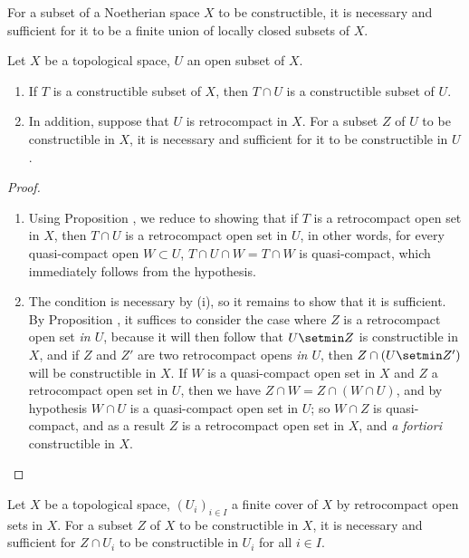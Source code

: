 \begin{corollary}[9.1.7]
\label{0.9.1.7}
For a subset of a Noetherian space $X$ to be constructible, it is necessary and sufficient for it to be a finite union of locally closed subsets of $X$.
\end{corollary}

\begin{proposition}[9.1.8]
\label{0.9.1.8}
Let $X$ be a topological space, $U$ an open subset of $X$.
\begin{enumerate}
  \item[{\rm(i)}] If $T$ is a constructible subset of $X$, then $T\cap U$ is a constructible subset of $U$.
  \item[{\rm(ii)}] In addition, suppose that $U$ is retrocompact in $X$. For a subset $Z$ of $U$ to be constructible in $X$, it is necessary and sufficient for it to be constructible in $U$.
\end{enumerate}
\end{proposition}

\begin{proof}
\medskip\noindent
\begin{enumerate}
  \item[(i)] Using Proposition , we reduce to showing that if $T$ is a retrocompact open set in $X$, then $T\cap U$ is a retrocompact open set in $U$, in other words, for every quasi-compact open $W\subset U$, $T\cap U\cap W=T\cap W$ is quasi-compact, which immediately follows from the hypothesis.
  \item[(ii)] The condition is necessary by (i), so it remains to show that it is sufficient.
    By Proposition , it suffices to consider the case where $Z$ is a retrocompact open set \emph{in $U$}, because it will then follow that $U\setmin Z$ is constructible in $X$, and if $Z$ and $Z'$ are two retrocompact opens \emph{in $U$}, then $Z\cap(U\setmin Z')$ will be constructible in $X$.
    If $W$ is a quasi-compact open set in $X$ and $Z$ a retrocompact open set in $U$, then we have $Z\cap W=Z\cap(W\cap U)$, and by hypothesis $W\cap U$ is a quasi-compact open set in $U$; so $W\cap Z$ is quasi-compact, and as a result $Z$ is a retrocompact open set in $X$, and \emph{a fortiori} constructible in $X$.
\end{enumerate}
\end{proof}

\begin{corollary}[9.1.9]
\label{0.9.1.9}
Let $X$ be a topological space, $(U_i)_{i\in I}$ a finite cover of $X$ by retrocompact open sets in $X$.
For a subset $Z$ of $X$ to be constructible in $X$, it is necessary and sufficient for $Z\cap U_i$ to be constructible in $U_i$ for all $i\in I$.
\end{corollary}

